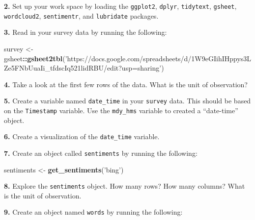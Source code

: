 \documentclass[]{book}
\newenvironment{Shaded}{\begin{snugshade}}{\end{snugshade}}
\newcommand{\KeywordTok}[1]{\textcolor[rgb]{0.13,0.29,0.53}{\textbf{#1}}}
\newcommand{\NormalTok}[1]{#1}
\newcommand{\OperatorTok}[1]{\textcolor[rgb]{0.81,0.36,0.00}{\textbf{#1}}}
\newcommand{\StringTok}[1]{\textcolor[rgb]{0.31,0.60,0.02}{#1}}
\begin{document}
\textbf{2.} Set up your work space by loading the \texttt{ggplot2}, \texttt{dplyr}, \texttt{tidytext}, \texttt{gsheet}, \texttt{wordcloud2}, \texttt{sentimentr}, and \texttt{lubridate} packages.

\textbf{3.} Read in your survey data by running the following:

\begin{Shaded}
\begin{Highlighting}[]
\NormalTok{survey <-}\StringTok{ }\NormalTok{gsheet}\OperatorTok{::}\KeywordTok{gsheet2tbl}\NormalTok{(}\StringTok{'https://docs.google.com/spreadsheets/d/1W9eGIihIHppys3LZe5FNbUuaIi_tfdscIq521lidRBU/edit?usp=sharing'}\NormalTok{)}
\end{Highlighting}
\end{Shaded}

\textbf{4.} Take a look at the first few rows of the data. What is the unit of observation?

\textbf{5.} Create a variable named \texttt{date\_time} in your \texttt{survey} data. This should be based on the \texttt{Timestamp} variable. Use the \texttt{mdy\_hms} variable to created a ``date-time'' object.

\textbf{6.} Create a visualization of the \texttt{date\_time} variable.

\textbf{7.} Create an object called \texttt{sentiments} by running the following:

\begin{Shaded}
\begin{Highlighting}[]
\NormalTok{sentiments <-}\StringTok{ }\KeywordTok{get_sentiments}\NormalTok{(}\StringTok{'bing'}\NormalTok{)}
\end{Highlighting}
\end{Shaded}

\textbf{8.} Explore the \texttt{sentiments} object. How many rows? How many columns? What is the unit of observation.

\textbf{9.} Create an object named \texttt{words} by running the following:

\begin{Shaded}
\end{Shaded}
\end{document}

